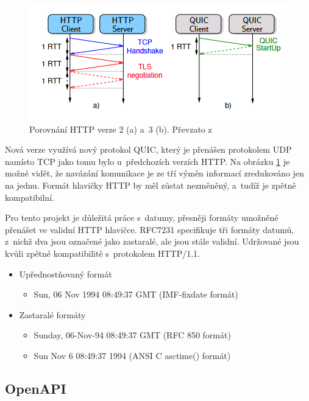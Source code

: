 \begin{figure}[h]
    \centering
    \includegraphics[width=0.8\linewidth]{other-fig/http_comparison.png}
    \caption{Porovnání HTTP verze 2 (a) a 3 (b). Převzato z \cite{HTTP3}}
    \label{fig:http_comparison}
\end{figure}

Nová verze využívá nový protokol QUIC, který je přenášen protokolem UDP namísto TCP jako tomu bylo u předchozích verzích HTTP. Na obrázku \ref{fig:http_comparison}
je možné vidět, že navázání komunikace je ze tří výměn informací zredukováno jen na jednu. Formát hlavičky HTTP by měl zůstat nezměněný, a tudíž je zpětně kompatibilní.

Pro tento projekt je důležitá práce s datumy, přesněji formáty umožněné přenášet ve validní HTTP hlavičce. RFC7231 specifikuje tři formáty datumů, z nichž dva
jsou označené jako zastaralé, ale jsou stále validní. Udržované jsou kvůli zpětné kompatibilitě s protokolem HTTP/1.1.\cite{RFC7231}

\newpage

\begin{itemize}
    \item Upřednostňovaný formát
    \begin{itemize}
        \item Sun, 06 Nov 1994 08:49:37 GMT (IMF-fixdate formát)
    \end{itemize}
    \item Zastaralé formáty
    \begin{itemize}
        \item Sunday, 06-Nov-94 08:49:37 GMT (RFC 850 formát)
        \item Sun Nov  6 08:49:37 1994 (ANSI C asctime() formát)
    \end{itemize}
\end{itemize}

\subsection{OpenAPI}

